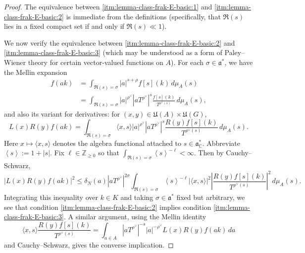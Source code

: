 \begin{proof}
  The equivalence between \eqref{itm:lemma-class-frak-E-basic:1} and \eqref{itm:lemma-class-frak-E-basic:2} is immediate from the definitions (specifically, that $\Re(s)$ lies in a fixed compact set if and only if $\Re(s) \ll 1$).

  We now verify the equivalence between \eqref{itm:lemma-class-frak-E-basic:2} and \eqref{itm:lemma-class-frak-E-basic:3} (which may be understood as a form of Paley--Wiener theory for certain vector-valued functions on $A$).  For each $\sigma \in \mathfrak{a}^*$, we have the Mellin expansion
  \begin{align*}
    f(a k)
    &= \int_{\Re(s) = \sigma } |a|^{s + \rho} f[s](k) \, d \mu_A(s) \\
    &= \int_{\Re(s) = \sigma } |a|^{\rho^\vee} \left\lvert a T^{\rho^\vee } \right\rvert^{s} \frac{f[s](k)}{T^{\rho^\vee(s)}} \, d \mu_A(s),
  \end{align*}
  and also its variant for derivatives: for $(x,y) \in \mathfrak{U}(A) \times \mathfrak{U}(G)$,
  \begin{equation*}
    L(x) R(y) f(a k) =
    \int_{\Re(s) = \sigma }
    \langle x, s \rangle
    |a|^{\rho^\vee} \left\lvert a T^{\rho^\vee } \right\rvert^{s} \frac{R(y) f[s](k)}{T^{\rho^\vee(s)}} \, d \mu_A(s).
  \end{equation*}
  Here $x \mapsto \langle x, s \rangle$ denotes the algebra functional attached to $s \in \mathfrak{a}_{\mathbb{C}}^*$.  Abbreviate $\left\langle s \right\rangle := 1 + |s|$.  Fix $\ell \in \mathbb{Z}_{\geq 0}$ so that $\int_{\Re(s) = \sigma} \left\langle s \right\rangle^{-\ell} < \infty$.  Then by Cauchy--Schwarz,
  \begin{equation}\label{eq:lx-ry-fa}
    |L(x) R(y) f(a k)|^2 \leq
    \delta_N(a)
    \left\lvert a T^{\rho^\vee } \right\rvert^{2 \sigma }
    \int_{\Re(s) = \sigma }
    \left\langle s \right\rangle^{-\ell}
    \left\lvert \langle x, s \rangle \right\rvert^2
    \left\lvert \frac{R(y) f[s](k)}{T^{\rho^\vee(s)}} \right\rvert^2
    \, d \mu_A(s).
  \end{equation}
  Integrating this inequality over $k \in K$ and taking $\sigma \in \mathfrak{a}^*$ fixed but arbitrary, we see that condition \eqref{itm:lemma-class-frak-E-basic:2} implies condition \eqref{itm:lemma-class-frak-E-basic:3}.  A similar argument, using the Mellin identity
  \begin{equation*}
    \langle x,  s \rangle
    \frac{R(y) f[s](k)}{T^{\rho^\vee(s)}}
    =
    \int_{a \in A}
    \left\lvert a T^{\rho^\vee} \right\rvert^{-s}
    |a|^{-\rho^\vee} L(x) R(y) f(a k) \, d a
  \end{equation*}
  and Cauchy--Schwarz, gives the converse implication.
\end{proof}

